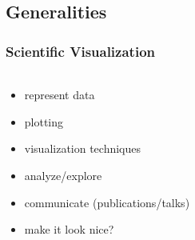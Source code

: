 

\subsection{Generalities}
\begin{frame}
    \frametitle{Scientific Visualization}
    \framesubtitle{}

    \vspace{-3.5mm}
    \begin{columns} %
    \begin{column}{5.325cm}
        \begin{itemize}
                \item represent data
                \item plotting
                \item visualization techniques
                \item analyze/explore
                \item communicate (publications/talks)
                \item make it look nice?
        \end{itemize}

        \centering


\end{column}
\end{columns}
\end{frame}
